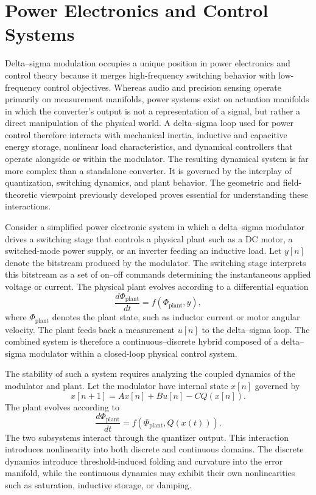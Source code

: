
\chapter{Power Electronics and Control Systems}

Delta–sigma modulation occupies a unique position in power electronics and control theory because it merges high-frequency switching behavior with low-frequency control objectives. Whereas audio and precision sensing operate primarily on measurement manifolds, power systems exist on actuation manifolds in which the converter’s output is not a representation of a signal, but rather a direct manipulation of the physical world. A delta–sigma loop used for power control therefore interacts with mechanical inertia, inductive and capacitive energy storage, nonlinear load characteristics, and dynamical controllers that operate alongside or within the modulator. The resulting dynamical system is far more complex than a standalone converter. It is governed by the interplay of quantization, switching dynamics, and plant behavior. The geometric and field-theoretic viewpoint previously developed proves essential for understanding these interactions.

Consider a simplified power electronic system in which a delta–sigma modulator drives a switching stage that controls a physical plant such as a DC motor, a switched-mode power supply, or an inverter feeding an inductive load. Let \(y[n]\) denote the bitstream produced by the modulator. The switching stage interprets this bitstream as a set of on–off commands determining the instantaneous applied voltage or current. The physical plant evolves according to a differential equation
\[
\frac{d\Phi_{\mathrm{plant}}}{dt} = f(\Phi_{\mathrm{plant}}, y),
\]
where \( \Phi_{\mathrm{plant}} \) denotes the plant state, such as inductor current or motor angular velocity. The plant feeds back a measurement \(u[n]\) to the delta–sigma loop. The combined system is therefore a continuous–discrete hybrid composed of a delta–sigma modulator within a closed-loop physical control system.

The stability of such a system requires analyzing the coupled dynamics of the modulator and plant. Let the modulator have internal state \(x[n]\) governed by
\[
x[n+1] = A x[n] + B u[n] - C Q(x[n]).
\]
The plant evolves according to
\[
\frac{d\Phi_{\mathrm{plant}}}{dt} = f(\Phi_{\mathrm{plant}}, Q(x(t))).
\]
The two subsystems interact through the quantizer output. This interaction introduces nonlinearity into both discrete and continuous domains. The discrete dynamics introduce threshold-induced folding and curvature into the error manifold, while the continuous dynamics may exhibit their own nonlinearities such as saturation, inductive storage, or damping.

